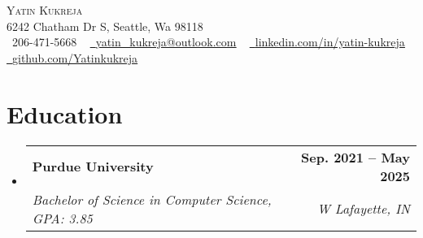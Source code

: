 \documentclass[letterpaper,11pt]{article}
\makeatletter
\newcommand{\resumeSubheading}[4]{
  \vspace{-2pt}\item
    \begin{tabular*}{1.0\textwidth}[t]{l@{\extracolsep{\fill}}r}
      \textbf{#1} & \textbf{\small #2} \\
      \textit{\small#3} & \textit{\small #4} \\
    \end{tabular*}\vspace{-7pt}
}
\newcommand{\resumeSubHeadingListStart}{\begin{itemize}[leftmargin=0.0in, label={}]}
\newcommand{\resumeSubHeadingListEnd}{\end{itemize}}
\makeatother
\begin{document}

\begin{center}
    {\Huge \scshape Yatin Kukreja } \\ \vspace{1pt}
    6242 Chatham Dr S, Seattle, Wa 98118 \\ \vspace{1pt}
    \small \raisebox{-0.1\height}\ 206-471-5668 ~ \href{mailto:x@gmail.com}{\raisebox{-0.2\height}\  \underline{yatin\_kukreja@outlook.com}} ~ 
    \href{https://linkedin.com/in//}{\raisebox{-0.2\height}\ \underline{linkedin.com/in/yatin-kukreja}}  ~
    \href{https://github.com/}{\raisebox{-0.2\height}\ \underline{github.com/Yatinkukreja}}
    \vspace{-8pt}
\end{center}


\section{Education}
  \resumeSubHeadingListStart
    \resumeSubheading
      {Purdue University}{Sep. 2021 -- May 2025}
      {Bachelor of Science in Computer Science, GPA: 3.85}{W Lafayette, IN}
  \resumeSubHeadingListEnd

\end{document}

